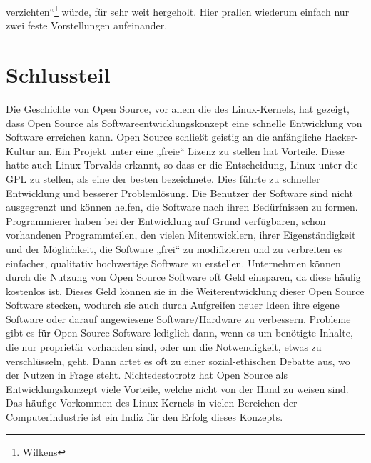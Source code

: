 \documentclass[a4paper,12pt]{article}
\begin{document}
verzichten“\footnote{Wilkens} würde, für sehr weit hergeholt. Hier prallen wiederum einfach nur zwei feste Vorstellungen aufeinander.
\newpage
\section{Schlussteil}
Die Geschichte von Open Source, vor allem die des Linux-Kernels, hat gezeigt, dass Open Source als Softwareentwicklungskonzept eine schnelle Entwicklung von Software erreichen kann. Open Source schließt geistig an die anfängliche Hacker-Kultur an. Ein Projekt unter eine „freie“ Lizenz zu stellen hat Vorteile. Diese hatte auch Linux Torvalds erkannt, so dass er die Entscheidung, Linux unter die GPL zu stellen, als eine der besten bezeichnete. Dies führte zu schneller Entwicklung und besserer Problemlösung. Die Benutzer der Software sind nicht ausgegrenzt und können helfen, die Software nach ihren Bedürfnissen zu formen. Programmierer haben bei der Entwicklung auf Grund verfügbaren, schon vorhandenen Programmteilen, den vielen Mitentwicklern, ihrer Eigenständigkeit und der Möglichkeit, die Software „frei“ zu modifizieren und zu verbreiten es einfacher, qualitativ hochwertige Software zu erstellen. Unternehmen können durch die Nutzung von Open Source Software oft Geld einsparen, da diese häufig kostenlos ist. Dieses Geld können sie in die Weiterentwicklung dieser Open Source Software stecken, wodurch sie auch durch Aufgreifen neuer Ideen ihre eigene Software oder darauf angewiesene Software/Hardware zu verbessern. Probleme gibt es für Open Source Software lediglich dann, wenn es um benötigte Inhalte, die nur proprietär vorhanden sind, oder um die Notwendigkeit, etwas zu verschlüsseln, geht. Dann artet es oft zu einer sozial-ethischen Debatte aus, wo der Nutzen in Frage steht. Nichtsdestotrotz hat Open Source als Entwicklungskonzept viele Vorteile, welche nicht von der Hand zu weisen sind. Das häufige Vorkommen des Linux-Kernels in vielen Bereichen der Computerindustrie ist ein Indiz für den Erfolg dieses Konzepts.
\newpage
{}
\end{document}
